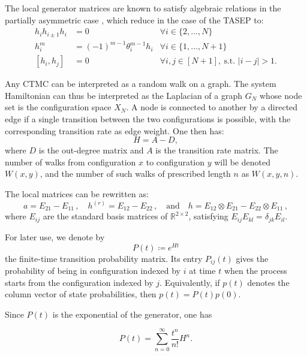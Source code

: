 \documentclass{article}
\begin{document}
The local generator matrices are known to satisfy algebraic relations in the partially asymmetric case \cite{schutz2001}, which reduce in the case of the TASEP to:
\begin{equation}
\label{algebraic rel}
\begin{array}{rlr}
h_i h_{i \pm 1} h_i & =0 & \forall i \in\{2, \ldots, N\} \\
h_i^m & =(-1)^{m-1}\theta_i^{m-1} h_i & \forall i \in\{1, \ldots, N+1\} \\
{\left[h_i, h_j\right]} & =0 & \forall i,j \in [N+1], \ \text{s.t. } |i-j|>1.
\end{array}
\end{equation}

Any CTMC can be interpreted as a random walk on a graph. The system Hamiltonian can thus be interpreted as the Laplacian of a graph $G_N$ whose node set is the configuration space $X_N$. A node is connected to another by a directed edge if a single transition between the two configurations is possible, with the corresponding transition rate as edge weight. One then has:
\begin{equation*}
    H=A-D,
\end{equation*}
where $D$ is the out-degree matrix and $A$ is the transition rate matrix. The number of walks from configuration $x$ to configuration $y$ will be denoted $W(x,y)$, and the number of such walks of prescribed length $n$ as $W(x,y,n)$.

The local matrices can be rewritten as:
\begin{equation*}
    a=E_{21}-E_{11}\,, 
    \quad
    h^{(r)}=E_{12}-E_{22}\,, 
    \quad\text{and}\quad
    h= E_{12} \otimes E_{21}-E_{22}\otimes E_{11}\,,
\end{equation*}
where $E_{ij}$ are the standard basis matrices of $\mathbb{R}^{2\times 2}$, satisfying $E_{ij} E_{kl}=\delta_{jk} E_{il}$.

For later use, we denote by
\begin{equation*}
    P(t)\coloneqq e^{Ht}
\end{equation*}
the finite-time transition probability matrix. Its entry \(P_{ij}(t)\) gives the probability of being in configuration indexed by \(i\) at time \(t\) when the process starts from the configuration indexed by \(j\). Equivalently, if \(p(t)\) denotes the column vector of state probabilities, then \(p(t)=P(t)p(0)\).

Since \(P(t)\) is the exponential of the generator, one has

\begin{equation*}
    P(t)=\sum_{n=0}^{\infty}\frac{t^n}{n!}H^n.
\end{equation*}
\end{document}
